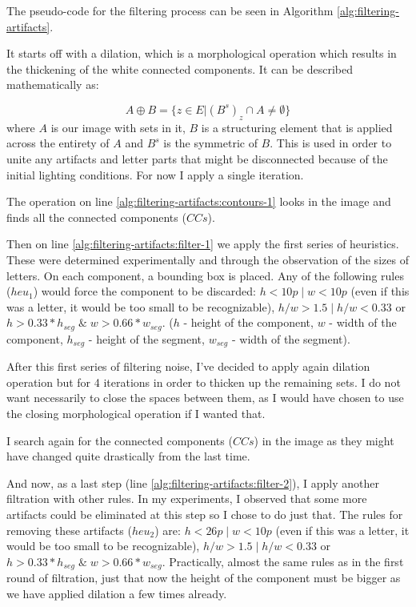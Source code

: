 The pseudo-code for the filtering process can be seen in Algorithm \ref{alg:filtering-artifacts}.

It starts off with a dilation, which is a morphological operation \cite{article:mathematical-morphology} which results in the thickening of the white connected components. It can be described mathematically as:

\[A \oplus B = \{z \in E | (B^s)_z \cap A \neq \emptyset \} \]
where $A$ is our image with sets in it, $B$ is a structuring element that is applied across the entirety of $A$ and $B^s$ is the symmetric of $B$. This is used in order to unite any artifacts and letter parts that might be disconnected because of the initial lighting conditions. For now I apply a single iteration.

The operation on line \ref{alg:filtering-artifacts:contours-1} looks in the image and finds all the connected components ($CCs$).

Then on line \ref{alg:filtering-artifacts:filter-1} we apply the first series of heuristics. These were determined experimentally and through the observation of the sizes of letters. On each component, a bounding box is placed. Any of the following rules ($heu_1$\label{filtering:heuristics-1}) would force the component to be discarded: $h < 10p \;|\; w < 10p$ (even if this was a letter, it would be too small to be recognizable), $h/w > 1.5 \;|\; h/w < 0.33$ or $h > 0.33*h_{seg} \;\&\; w > 0.66*w_{seg}$. ($h$ - height of the component, $w$ - width of the component, $h_{seg}$ - height of the segment, $w_{seg}$ - width of the segment).

After this first series of filtering noise, I've decided to apply again dilation operation but for 4 iterations in order to thicken up the remaining sets. I do not want necessarily to close the spaces between them, as I would have chosen to use the closing morphological operation if I wanted that.

I search again for the connected components ($CCs$) in the image as they might have changed quite drastically from the last time.

And now, as a last step (line \ref{alg:filtering-artifacts:filter-2}), I apply another filtration with other rules. In my experiments, I observed that some more artifacts could be eliminated at this step so I chose to do just that. The rules for removing these artifacts ($heu_2$\label{filtering:heuristics-2}) are:  $h < 26p \;|\; w < 10p$ (even if this was a letter, it would be too small to be recognizable), $h/w > 1.5 \;|\; h/w < 0.33$ or $h > 0.33*h_{seg} \;\&\; w > 0.66*w_{seg}$. Practically, almost the same rules as in the first round of filtration, just that now the height of the component must be bigger as we have applied dilation a few times already.


